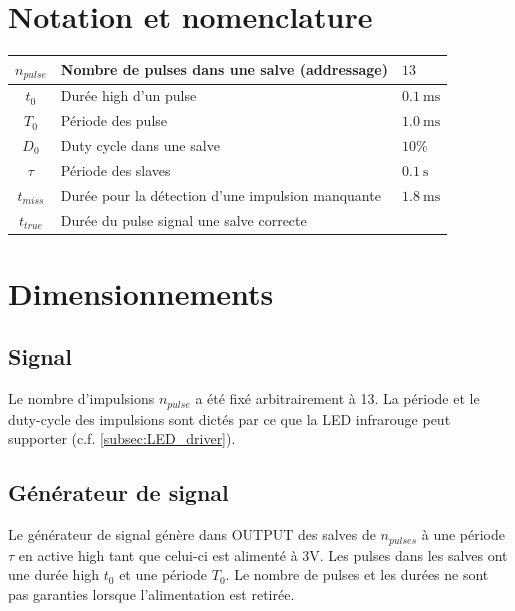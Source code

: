 \documentclass[french]{layout/Report}
\begin{document}
\section{Notation et nomenclature}

\begin{center}
	\begin{tabular}{| c | l | l |}
		\hline
		$n_{pulse}$	& Nombre de pulses dans une salve (addressage) & $13$ \\ \hline
		$t_0$				& Durée high d'un pulse	& $\SI{0.1}{\milli\second}$	\\ \hline
		$T_0$				& Période des pulse	& $\SI{1.0}{\milli\second}$	\\ \hline
		$D_0$				& Duty cycle dans une salve & $10\%$	\\ \hline
		$\tau$			& Période des slaves	& $\SI{0.1}{\second}$\\ \hline
		$t_{miss}$  & Durée pour la détection d'une impulsion manquante & $\SI{1.8}{\milli\second}$ \\ \hline
		$t_{true}$  & Durée du pulse signal une salve correcte & \\ \hline
	\end{tabular}
\end{center}

\section{Dimensionnements}
\subsection{Signal}
Le nombre d'impulsions $n_{pulse}$ a été fixé arbitrairement à 13. La période et le duty-cycle des impulsions sont dictés par ce que la LED infrarouge peut supporter (c.f. \ref{subsec:LED_driver}).

\subsection{Générateur de signal}
Le générateur de signal génère dans OUTPUT des salves de $n_{pulses}$ à une période $\tau$ en active high tant que celui-ci est alimenté à 3V. Les pulses dans les salves ont une durée high $t_0$ et une période $T_0$. Le nombre de pulses et les durées ne sont pas garanties lorsque l'alimentation est retirée.
\end{document}
